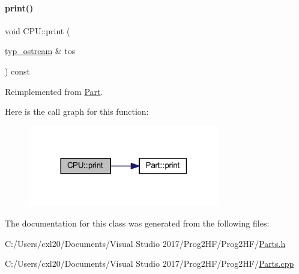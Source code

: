 \paragraph{\texorpdfstring{print()}{print()}\hspace{0.1cm}{\footnotesize\ttfamily [4/4]}}
{\footnotesize\ttfamily void C\+P\+U\+::print (\begin{DoxyParamCaption}\item[{\mbox{\hyperlink{structtyp__ostream}{typ\+\_\+ostream}} \&}]{tos }\end{DoxyParamCaption}) const\hspace{0.3cm}{\ttfamily [virtual]}}



Reimplemented from \mbox{\hyperlink{class_part_ab6396030e8b7a724731a8b54bd4942fc}{Part}}.

Here is the call graph for this function\+:
\nopagebreak
\begin{figure}[H]
\begin{center}
\leavevmode
\includegraphics[width=237pt]{class_c_p_u_aa2cf81d7f0005da72c7a99b1b9459c27_cgraph}
\end{center}
\end{figure}


The documentation for this class was generated from the following files\+:\begin{DoxyCompactItemize}
\item 
C\+:/\+Users/cxl20/\+Documents/\+Visual Studio 2017/\+Prog2\+H\+F/\+Prog2\+H\+F/\mbox{\hyperlink{_parts_8h}{Parts.\+h}}\item 
C\+:/\+Users/cxl20/\+Documents/\+Visual Studio 2017/\+Prog2\+H\+F/\+Prog2\+H\+F/\mbox{\hyperlink{_parts_8cpp}{Parts.\+cpp}}\end{DoxyCompactItemize}
